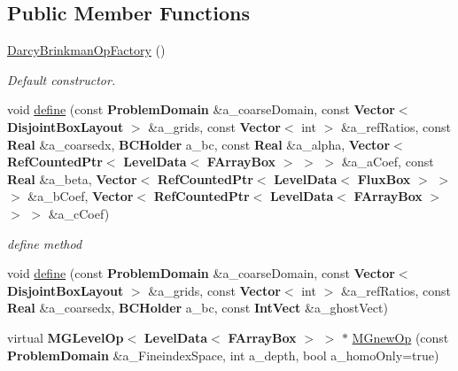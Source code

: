 \subsection*{Public Member Functions}
\begin{DoxyCompactItemize}
\item 
\mbox{\label{class_darcy_brinkman_op_factory_a33cfe1c1920f58a73f46b7dc5b9b0f3b}} 
\hyperlink{class_darcy_brinkman_op_factory_a33cfe1c1920f58a73f46b7dc5b9b0f3b}{Darcy\+Brinkman\+Op\+Factory} ()
\begin{DoxyCompactList}\small\item\em Default constructor. \end{DoxyCompactList}\item 
void \hyperlink{class_darcy_brinkman_op_factory_adffcc15076241ed69d214197b2c21433}{define} (const \textbf{ Problem\+Domain} \&a\+\_\+coarse\+Domain, const \textbf{ Vector}$<$ \textbf{ Disjoint\+Box\+Layout} $>$ \&a\+\_\+grids, const \textbf{ Vector}$<$ int $>$ \&a\+\_\+ref\+Ratios, const \textbf{ Real} \&a\+\_\+coarsedx, \textbf{ B\+C\+Holder} a\+\_\+bc, const \textbf{ Real} \&a\+\_\+alpha, \textbf{ Vector}$<$ \textbf{ Ref\+Counted\+Ptr}$<$ \textbf{ Level\+Data}$<$ \textbf{ F\+Array\+Box} $>$ $>$ $>$ \&a\+\_\+a\+Coef, const \textbf{ Real} \&a\+\_\+beta, \textbf{ Vector}$<$ \textbf{ Ref\+Counted\+Ptr}$<$ \textbf{ Level\+Data}$<$ \textbf{ Flux\+Box} $>$ $>$ $>$ \&a\+\_\+b\+Coef, \textbf{ Vector}$<$ \textbf{ Ref\+Counted\+Ptr}$<$ \textbf{ Level\+Data}$<$ \textbf{ F\+Array\+Box} $>$ $>$ $>$ \&a\+\_\+c\+Coef)
\begin{DoxyCompactList}\small\item\em define method \end{DoxyCompactList}\item 
void \hyperlink{class_darcy_brinkman_op_factory_a128c500e2c129aa3bc6ba7e20bf23cf1}{define} (const \textbf{ Problem\+Domain} \&a\+\_\+coarse\+Domain, const \textbf{ Vector}$<$ \textbf{ Disjoint\+Box\+Layout} $>$ \&a\+\_\+grids, const \textbf{ Vector}$<$ int $>$ \&a\+\_\+ref\+Ratios, const \textbf{ Real} \&a\+\_\+coarsedx, \textbf{ B\+C\+Holder} a\+\_\+bc, const \textbf{ Int\+Vect} \&a\+\_\+ghost\+Vect)
\item 
\mbox{\label{class_darcy_brinkman_op_factory_a6b5e609db52c2363aa015eb0b811d98d}} 
virtual \textbf{ M\+G\+Level\+Op}$<$ \textbf{ Level\+Data}$<$ \textbf{ F\+Array\+Box} $>$ $>$ $\ast$ \hyperlink{class_darcy_brinkman_op_factory_a6b5e609db52c2363aa015eb0b811d98d}{M\+Gnew\+Op} (const \textbf{ Problem\+Domain} \&a\+\_\+\+Fineindex\+Space, int a\+\_\+depth, bool a\+\_\+homo\+Only=true)

\end{DoxyCompactItemize}

